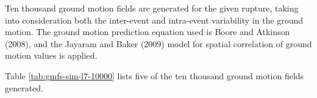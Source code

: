 Ten thousand ground motion fields are generated for the given rupture, taking into consideration both the inter-event and intra-event variability in the ground motion. The ground motion prediction equation used is Boore and Atkinson (2008), and the Jayaram and Baker (2009) model for spatial correlation of ground motion values is applied.



Table \ref{tab:gmfs-sim-l7-10000} lists five of the ten thousand ground motion fields generated.